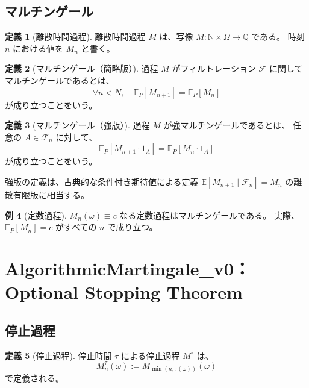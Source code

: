 \documentclass[a4paper,12pt]{ltjsarticle}
\theoremstyle{definition}
\newtheorem{definition}{定義}[section]
\newtheorem{example}[definition]{例}
\begin{document}
\subsection{マルチンゲール}

\begin{definition}[離散時間過程]
離散時間過程 $M$ は、写像 $M : \mathbb{N} \times \Omega \to \mathbb{Q}$ である。
時刻 $n$ における値を $M_n$ と書く。
\end{definition}

\begin{definition}[マルチンゲール（簡略版）]
過程 $M$ がフィルトレーション $\mathcal{F}$ に関してマルチンゲールであるとは、
\[
\forall n < N, \quad \mathbb{E}_P[M_{n+1}] = \mathbb{E}_P[M_n]
\]
が成り立つことをいう。
\end{definition}

\begin{definition}[マルチンゲール（強版）]
過程 $M$ が強マルチンゲールであるとは、
任意の $A \in \mathcal{F}_n$ に対して、
\[
\mathbb{E}_P[M_{n+1} \cdot 1_A] = \mathbb{E}_P[M_n \cdot 1_A]
\]
が成り立つことをいう。
\end{definition}

強版の定義は、古典的な条件付き期待値による定義
$\mathbb{E}[M_{n+1} \mid \mathcal{F}_n] = M_n$
の離散有限版に相当する。

\begin{example}[定数過程]
$M_n(\omega) \equiv c$ なる定数過程はマルチンゲールである。
実際、$\mathbb{E}_P[M_n] = c$ がすべての $n$ で成り立つ。
\end{example}

\section{AlgorithmicMartingale\_v0：Optional Stopping Theorem}

\subsection{停止過程}

\begin{definition}[停止過程]
停止時間 $\tau$ による停止過程 $M^\tau$ は、
\[
M^\tau_n(\omega) := M_{\min(n, \tau(\omega))}(\omega)
\]
で定義される。
\end{definition}

\begin{center}
\end{center}
\end{document}
